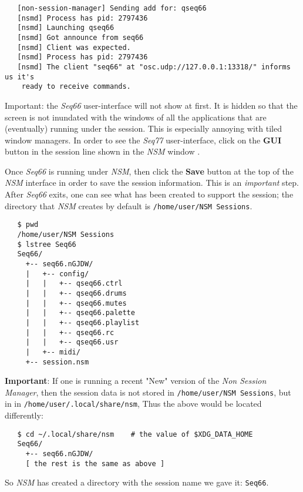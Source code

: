 \begin{verbatim}
   [non-session-manager] Sending add for: qseq66
   [nsmd] Process has pid: 2797436
   [nsmd] Launching qseq66
   [nsmd] Got announce from seq66
   [nsmd] Client was expected.
   [nsmd] Process has pid: 2797436
   [nsmd] The client "seq66" at "osc.udp://127.0.0.1:13318/" informs us it's
    ready to receive commands.
\end{verbatim}

   Important: the \textsl{Seq66} user-interface will not show at first.
   It is hidden so that the screen is not inundated with the windows of all the
   applications that are (eventually) running under the session.
   This is especially annoying with tiled window managers.
   In order to see the \textsl{Seq77} user-interface, click on
   the \textbf{GUI} button in the session line shown in the \textsl{NSM} window .

   Once \textsl{Seq66} is running under \textsl{NSM},
   then click the \textbf{Save}
   button at the top of the \textsl{NSM} interface in order
   to save the session information.
   This is an \textsl{important} step.
   After \textsl{Seq66} exits,
   one can see what has been created to support the session;
   the directory that \textsl{NSM}
   creates by default is \texttt{/home/user/NSM Sessions}.

\begin{verbatim}
   $ pwd
   /home/user/NSM Sessions
   $ lstree Seq66
   Seq66/
     +-- seq66.nGJDW/
     |   +-- config/
     |   |   +-- qseq66.ctrl
     |   |   +-- qseq66.drums
     |   |   +-- qseq66.mutes
     |   |   +-- qseq66.palette
     |   |   +-- qseq66.playlist
     |   |   +-- qseq66.rc
     |   |   +-- qseq66.usr
     |   +-- midi/
     +-- session.nsm
\end{verbatim}

   \textbf{Important}: If one is running a recent "New" version of the 
   \textsl{Non Session Manager}, then the session data is not stored
   in \texttt{/home/user/NSM Sessions},
   but in
   in \texttt{/home/user/.local/share/nsm},
   Thus the above would be located differently:

\begin{verbatim}
   $ cd ~/.local/share/nsm    # the value of $XDG_DATA_HOME
   Seq66/
     +-- seq66.nGJDW/
     [ the rest is the same as above ]
\end{verbatim}

   So \textsl{NSM} has created a directory with the session name we gave it:
   \texttt{Seq66}.

